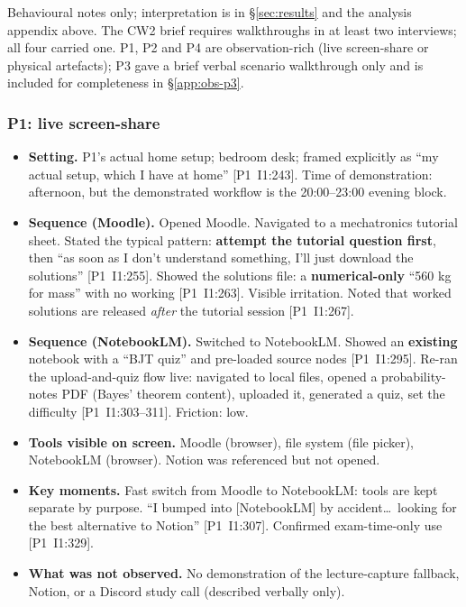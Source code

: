 \documentclass[a4paper,11pt]{article}
\begin{document}
Behavioural notes only; interpretation is in \S\ref{sec:results} and
the analysis appendix above. The CW2 brief requires walkthroughs in at
least two interviews; all four carried one. P1, P2 and P4 are
observation-rich (live screen-share or physical artefacts); P3 gave a
brief verbal scenario walkthrough only and is included for completeness
in \S\ref{app:obs-p3}.

\subsubsection*{P1: live screen-share}\label{app:obs-p1}
\begin{itemize}[leftmargin=1.2em,itemsep=2pt]
    \item \textbf{Setting.} P1's actual home setup; bedroom desk;
          framed explicitly as ``my actual setup, which I have at
          home'' [P1~I1:243]. Time of demonstration: afternoon, but
          the demonstrated workflow is the 20:00--23:00 evening block.
    \item \textbf{Sequence (Moodle).} Opened Moodle. Navigated to a
          mechatronics tutorial sheet. Stated the typical pattern:
          \textbf{attempt the tutorial question first}, then ``as soon
          as I don't understand something, I'll just download the
          solutions'' [P1~I1:255]. Showed the solutions file: a
          \textbf{numerical-only} ``560 kg for mass'' with no working
          [P1~I1:263]. Visible irritation. Noted that worked solutions
          are released \emph{after} the tutorial session [P1~I1:267].
    \item \textbf{Sequence (NotebookLM).} Switched to NotebookLM.
          Showed an \textbf{existing} notebook with a ``BJT quiz'' and
          pre-loaded source nodes [P1~I1:295]. Re-ran the
          upload-and-quiz flow live: navigated to local files, opened
          a probability-notes PDF (Bayes' theorem content), uploaded
          it, generated a quiz, set the difficulty
          [P1~I1:303--311]. Friction: low.
    \item \textbf{Tools visible on screen.} Moodle (browser), file
          system (file picker), NotebookLM (browser). Notion was
          referenced but not opened.
    \item \textbf{Key moments.} Fast switch from Moodle to NotebookLM:
          tools are kept separate by purpose. ``I bumped into
          [NotebookLM] by accident\dots\ looking for the best
          alternative to Notion'' [P1~I1:307]. Confirmed exam-time-only
          use [P1~I1:329].
    \item \textbf{What was not observed.} No demonstration of the
          lecture-capture fallback, Notion, or a Discord study call
          (described verbally only).
\end{itemize}
\end{document}
